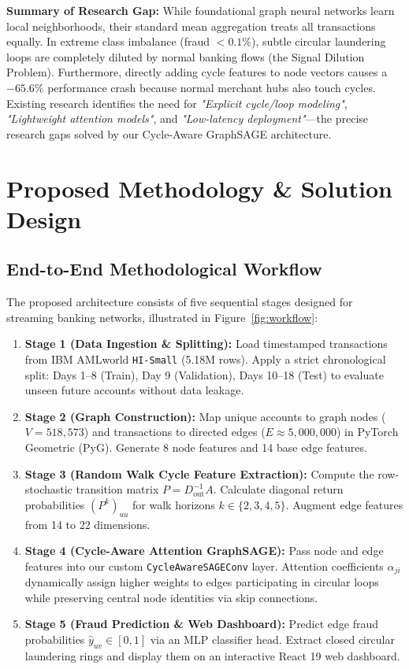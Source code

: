 \documentclass[11pt, a4paper]{article}
\begin{document}
\noindent
\textbf{Summary of Research Gap:} While foundational graph neural networks learn local neighborhoods, their standard mean aggregation treats all transactions equally. In extreme class imbalance (fraud $<0.1\%$), subtle circular laundering loops are completely diluted by normal banking flows (the Signal Dilution Problem). Furthermore, directly adding cycle features to node vectors causes a $-65.6\%$ performance crash because normal merchant hubs also touch cycles. Existing research identifies the need for \textit{"Explicit cycle/loop modeling"}, \textit{"Lightweight attention models"}, and \textit{"Low-latency deployment"}—the precise research gaps solved by our Cycle-Aware GraphSAGE architecture.

\section{Proposed Methodology \& Solution Design}

\subsection{End-to-End Methodological Workflow}
\noindent
The proposed architecture consists of five sequential stages designed for streaming banking networks, illustrated in Figure~\ref{fig:workflow}:
\begin{enumerate}[noitemsep, topsep=2pt]
    \item \textbf{Stage 1 (Data Ingestion \& Splitting):} Load timestamped transactions from IBM AMLworld \texttt{HI-Small} (5.18M rows). Apply a strict chronological split: Days 1--8 (Train), Day 9 (Validation), Days 10--18 (Test) to evaluate unseen future accounts without data leakage.
    \item \textbf{Stage 2 (Graph Construction):} Map unique accounts to graph nodes ($V = 518,573$) and transactions to directed edges ($E \approx 5,000,000$) in PyTorch Geometric (PyG). Generate 8 node features and 14 base edge features.
    \item \textbf{Stage 3 (Random Walk Cycle Feature Extraction):} Compute the row-stochastic transition matrix $P = D_{\text{out}}^{-1} A$. Calculate diagonal return probabilities $(P^k)_{uu}$ for walk horizons $k \in \{2, 3, 4, 5\}$. Augment edge features from 14 to 22 dimensions.
    \item \textbf{Stage 4 (Cycle-Aware Attention GraphSAGE):} Pass node and edge features into our custom \texttt{CycleAwareSAGEConv} layer. Attention coefficients $\alpha_{ji}$ dynamically assign higher weights to edges participating in circular loops while preserving central node identities via skip connections.
    \item \textbf{Stage 5 (Fraud Prediction \& Web Dashboard):} Predict edge fraud probabilities $\hat{y}_{uv} \in [0, 1]$ via an MLP classifier head. Extract closed circular laundering rings and display them on an interactive React 19 web dashboard.
\end{enumerate}
\end{document}

